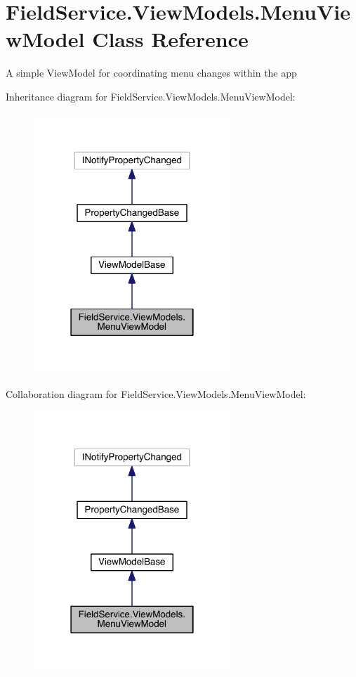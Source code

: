 \hypertarget{class_field_service_1_1_view_models_1_1_menu_view_model}{\section{Field\+Service.\+View\+Models.\+Menu\+View\+Model Class Reference}
\label{class_field_service_1_1_view_models_1_1_menu_view_model}
}


A simple View\+Model for coordinating menu changes within the app  




Inheritance diagram for Field\+Service.\+View\+Models.\+Menu\+View\+Model\+:
\nopagebreak
\begin{figure}[H]
\begin{center}
\leavevmode
\includegraphics[width=210pt]{class_field_service_1_1_view_models_1_1_menu_view_model__inherit__graph}
\end{center}
\end{figure}


Collaboration diagram for Field\+Service.\+View\+Models.\+Menu\+View\+Model\+:
\nopagebreak
\begin{figure}[H]
\begin{center}
\leavevmode
\includegraphics[width=210pt]{class_field_service_1_1_view_models_1_1_menu_view_model__coll__graph}
\end{center}
\end{figure}
